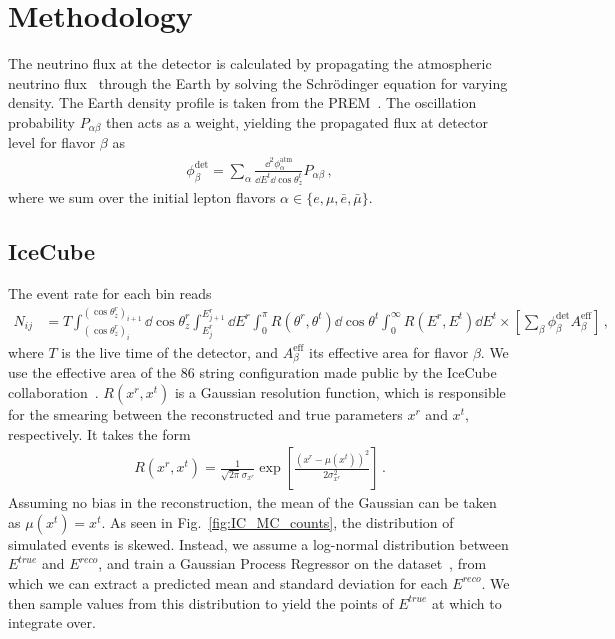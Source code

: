 \documentclass[draft=True]{revtex4-2}
\begin{document}
\section{Methodology}
The neutrino flux at the detector is calculated by propagating the atmospheric neutrino flux~\cite{hondapaper} through the Earth by solving the 
Schrödinger equation for varying density. The Earth density profile is taken from the PREM~\cite{PREM}. 
The oscillation probability $P_{\alpha \beta}$ then acts as a weight, yielding the propagated flux at detector level for flavor $\beta$ as 
\begin{align}\label{eq:propFlux}
    \phi_\beta^\text{det} = \sum_\alpha \frac{\dd^2 \phi_\alpha^\text{atm}}{\dd E^t \dd \cos{\theta^t_z}} P_{\alpha\beta}\,,
\end{align}
where we sum over the initial lepton flavors $\alpha \in \{e,\mu, \bar{e}, \bar{\mu}\}$.
\subsection{IceCube}\label{ch:ICmethod}
The event rate for each bin reads
\begin{align}\label{eq:ICevents}
    N_{ij} &= T \int_{(\cos{\theta_z^r})_i}^{(\cos{\theta_z^r})_{i+1}} \dd \cos{\theta^r_z} \int_{E^r_{j}}^{E^r_{j+1}} \dd E^r \int_0^\pi R(\theta^r,\theta^t) \dd \cos{\theta^t} \int_0^\infty R(E^r,E^t) \dd E^t
    \times \left[ \sum_\beta \phi_\beta^\text{det}  A^\text{eff}_\beta\right]\,,
\end{align}
where $T$ is the live time of the detector, and $A^\text{eff}_\beta$ its effective area for flavor $\beta$. We use the effective area of the 86 string configuration made public by the IceCube collaboration~\cite{ICaeff}. $R(x^r,x^t)$ is a Gaussian resolution function, 
which is responsible for the smearing between the reconstructed and true parameters $x^r$ and $x^t$, respectively. It takes the form 
\begin{align}
    R(x^r, x^t) = \frac{1}{\sqrt{2\pi} \sigma_{x^r}} \exp\left[\frac{(x^r-\mu(x^t))^2}{2\sigma_{x^r}^2}\right]\,.
\end{align}
Assuming no bias in the reconstruction, the mean of the Gaussian can be taken as $\mu(x^t) = x^t$. As seen in Fig.~\ref{fig:IC_MC_counts}, the distribution of 
simulated events is skewed. Instead, we assume a log-normal distribution between $E^{true}$ and $E^{reco}$, and train a Gaussian Process Regressor on the dataset~\cite{IC2016}, from which
we can extract a predicted mean and standard deviation for each $E^{reco}$. We then sample values from this distribution to yield 
the points of $E^{true}$ at which to integrate over. 
\end{document}

